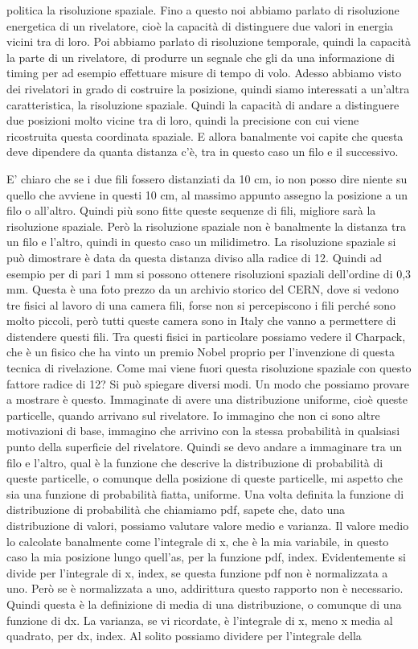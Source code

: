 {politica la risoluzione spaziale. Fino a questo noi abbiamo parlato di risoluzione energetica di un rivelatore, cioè la capacità di distinguere due valori in energia vicini tra di loro. Poi abbiamo parlato di risoluzione temporale, quindi la capacità la parte di un rivelatore, di produrre un segnale che gli da una informazione di timing per ad esempio effettuare misure di tempo di volo. Adesso abbiamo visto dei rivelatori in grado di costruire la posizione, quindi siamo interessati a un'altra caratteristica, la risoluzione spaziale. Quindi la capacità di andare a distinguere due posizioni molto vicine tra di loro, quindi la precisione con cui viene ricostruita questa coordinata spaziale. E allora banalmente voi capite che questa deve dipendere da quanta distanza c'è, tra in questo caso un filo e il successivo. 

E' chiaro che se i due fili fossero distanziati da 10 cm, io non posso dire niente su quello che avviene in questi 10 cm, al massimo appunto assegno la posizione a un filo o all'altro. Quindi più sono fitte queste sequenze di fili, migliore sarà la risoluzione spaziale. Però la risoluzione spaziale non è banalmente la distanza tra un filo e l'altro, quindi in questo caso un milidimetro. La risoluzione spaziale si può dimostrare è data da questa distanza diviso alla radice di 12. Quindi ad esempio per di pari 1 mm si possono ottenere risoluzioni spaziali dell'ordine di 0,3 mm. Questa è una foto prezzo da un archivio storico del CERN, dove si vedono tre fisici al lavoro di una camera fili, forse non si percepiscono i fili perché sono molto piccoli, però tutti queste camera sono in Italy che vanno a permettere di distendere questi fili. Tra questi fisici in particolare possiamo vedere il Charpack, che è un fisico che ha vinto un premio Nobel proprio per l'invenzione di questa tecnica di rivelazione. Come mai viene fuori questa risoluzione spaziale con questo fattore radice di 12? Si può spiegare diversi modi. Un modo che possiamo provare a mostrare è questo. Immaginate di avere una distribuzione uniforme, cioè queste particelle, quando arrivano sul rivelatore. Io immagino che non ci sono altre motivazioni di base, immagino che arrivino con la stessa probabilità in qualsiasi punto della superficie del rivelatore. Quindi se devo andare a immaginare tra un filo e l'altro, qual è la funzione che descrive la distribuzione di probabilità di queste particelle, o comunque della posizione di queste particelle, mi aspetto che sia una funzione di probabilità fiatta, uniforme. Una volta definita la funzione di distribuzione di probabilità che chiamiamo pdf, sapete che, dato una distribuzione di valori, possiamo valutare valore medio e varianza. Il valore medio lo calcolate banalmente come l'integrale di x, che è la mia variabile, in questo caso la mia posizione lungo quell'as, per la funzione pdf, index. Evidentemente si divide per l'integrale di x, index, se questa funzione pdf non è normalizzata a uno. Però se è normalizzata a uno, addirittura questo rapporto non è necessario. Quindi questa è la definizione di media di una distribuzione, o comunque di una funzione di dx. La varianza, se vi ricordate, è l'integrale di x, meno x media al quadrato, per dx, index. Al solito possiamo dividere per l'integrale della }
